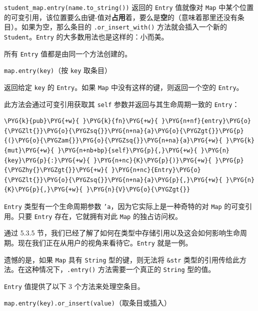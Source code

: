 \texttt{student\_map.entry(name.to\_string())} 返回的 \texttt{Entry} 值就像对 \texttt{Map} 中某个位置的可变引用，该位置要么由键-值对\textbf{占用}着，要么是\textbf{空}的（意味着那里还没有条目）。如果为空，那么条目的 \texttt{.or\_insert\_with()} 方法就会插入一个新的 \texttt{Student}。\texttt{Entry} 的大多数用法也是这样的：小而美。

所有 \texttt{Entry} 值都是由同一个方法创建的。

\begin{mySidenote}
\texttt{map.entry(key)}（按 \texttt{key} 取条目）
\end{mySidenote}

返回给定 \texttt{key} 的 \texttt{Entry}。如果 \texttt{Map} 中没有这样的键，则返回一个空的 \texttt{Entry}。

此方法会通过可变引用获取其 \texttt{self} 参数并返回与其生命周期一致的 \texttt{Entry}：

\begin{Verbatim}[commandchars=\\\{\},breaklines=true,breakanywhere=true,fontsize=\codefont,xleftmargin=17bp]
\PYG{k}{pub}\PYG{+w}{ }\PYG{k}{fn}\PYG{+w}{ }\PYG{n+nf}{entry}\PYG{o}{\PYGZlt{}}\PYG{o}{\PYGZsq{}}\PYG{n+na}{a}\PYG{o}{\PYGZgt{}}\PYG{p}{(}\PYG{o}{\PYGZam{}}\PYG{o}{\PYGZsq{}}\PYG{n+na}{a}\PYG{+w}{ }\PYG{k}{mut}\PYG{+w}{ }\PYG{n+nb+bp}{self}\PYG{p}{,}\PYG{+w}{ }\PYG{n}{key}\PYG{p}{:}\PYG{+w}{ }\PYG{n+nc}{K}\PYG{p}{)}\PYG{+w}{ }\PYG{p}{\PYGZhy{}\PYGZgt{}}\PYG{+w}{ }\PYG{n+nc}{Entry}\PYG{o}{\PYGZlt{}}\PYG{o}{\PYGZsq{}}\PYG{n+na}{a}\PYG{p}{,}\PYG{+w}{ }\PYG{n}{K}\PYG{p}{,}\PYG{+w}{ }\PYG{n}{V}\PYG{o}{\PYGZgt{}}
\end{Verbatim}

\texttt{Entry} 类型有一个生命周期参数 \texttt{'a}，因为它实际上是一种奇特的对 \texttt{Map} 的可变引用。只要 \texttt{Entry} 存在，它就拥有对此 \texttt{Map} 的独占访问权。

通过 5.3.5 节，我们已经了解了如何在类型中存储引用以及这会如何影响生命周期。现在我们正在从用户的视角来看待它。\texttt{Entry} 就是一例。

遗憾的是，如果 \texttt{Map} 具有 \texttt{String} 型的键，则无法将 \texttt{\&str} 类型的引用传给此方法。在这种情况下，\texttt{.entry()} 方法需要一个真正的 \texttt{String} 型的值。

\texttt{Entry} 值提供了以下 3 个方法来处理空条目。

\begin{myNote}
\texttt{map.entry(key).or\_insert(value)}（取条目或插入）
\end{myNote}

